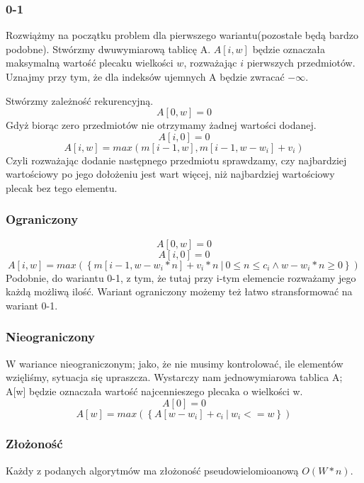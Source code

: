 \subsubsection{0-1}
Rozwiążmy na początku problem dla pierwszego wariantu(pozostałe będą bardzo podobne).
Stwórzmy dwuwymiarową tablicę A.
$A[i, w]$ będzie oznaczała maksymalną wartość plecaku wielkości $w$, rozważając $i$ pierwszych przedmiotów.
Uznajmy przy tym, że dla indeksów ujemnych A będzie zwracać $-\infty$.

Stwórzmy zależność rekurencyjną.
\[A[0, w] = 0\]
Gdyż biorąc zero przedmiotów nie otrzymamy żadnej wartości dodanej.
\[A[i, 0] = 0\]
\[A[i, w] = max(m[i - 1, w], m[i - 1, w - w_i] + v_i)\]
Czyli rozważając dodanie następnego przedmiotu sprawdzamy, czy najbardziej wartościowy po jego dołożeniu jest wart więcej, niż najbardziej wartościowy plecak bez tego elementu.

\subsubsection{Ograniczony}
\[A[0, w] = 0\]
\[A[i, 0] = 0\]
\[A[i, w] = max(\left \{ m[i - 1, w - w_i * n] + v_i * n ~|~ 0 \leq n \leq c_i \wedge w - w_i * n \geq 0 \right \})\]
Podobnie, do wariantu 0-1, z tym, że tutaj przy i-tym elemencie rozważamy jego każdą możliwą ilość.
Wariant ograniczony możemy też łatwo stransformować na wariant 0-1.

\subsubsection{Nieograniczony}
W wariance nieograniczonym; jako, że nie musimy kontrolować, ile elementów wzięliśmy, sytuacja się upraszcza.
Wystarczy nam jednowymiarowa tablica A; A[w] będzie oznaczała wartość najcennieszego plecaka o wielkości w.
\[A[0] = 0\]
\[A[w] = max(\left \{ A[w - w_i] + c_i ~|~ w_i <= w \right \})\]

\subsubsection{Złożoność}
Każdy z podanych algorytmów ma złożoność pseudowielomioanową $O(W * n)$.
